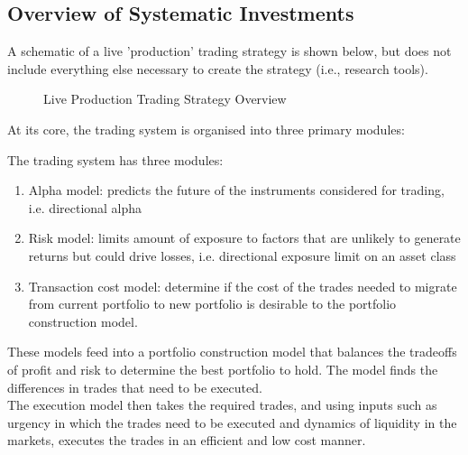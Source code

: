 \subsection{Overview of Systematic Investments}

A schematic of a live 'production' trading strategy is shown below, but does not include everything else necessary to create the strategy (i.e., research tools).

\begin{figure}[H]
\centering

\caption{Live Production Trading Strategy Overview}
\end{figure}

At its core, the trading system is organised into three primary modules:

The trading system has three modules:
\begin{enumerate}[label=\roman*.]
\setlength{\itemsep}{0pt}
\item Alpha model: predicts the future of the instruments considered for trading, i.e. directional alpha
\item Risk model: limits amount of exposure to factors that are unlikely to generate returns but could drive losses, i.e. directional exposure limit on an asset class
\item Transaction cost model: determine if the cost of the trades needed to migrate from current portfolio to new portfolio is desirable to the portfolio construction model.
\end{enumerate}
These models feed into a portfolio construction model that balances the tradeoffs of profit and risk to determine the best portfolio to hold. The model finds the differences in trades that need to be executed.\\
The execution model then takes the required trades, and using inputs such as urgency in which the trades need to be executed and dynamics of liquidity in the markets, executes the trades in an efficient and low cost manner.\\

